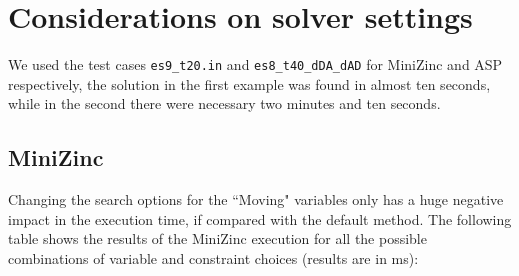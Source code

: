 \documentclass[11pt]{article}
\begin{document}
\section{Considerations on solver settings}
We used the test cases \verb+es9_t20.in+ and \verb+es8_t40_dDA_dAD+ for MiniZinc and ASP respectively, 
the solution in the first example was found in almost ten seconds, while in the second there were necessary two minutes and ten seconds.
\subsection{MiniZinc}
Changing the search options for the ``Moving" variables only has a huge negative impact in the execution time, if compared with the default method.
The following table shows the results of the MiniZinc execution for all the possible combinations of variable and constraint choices (results are in ms):
\end{document}
